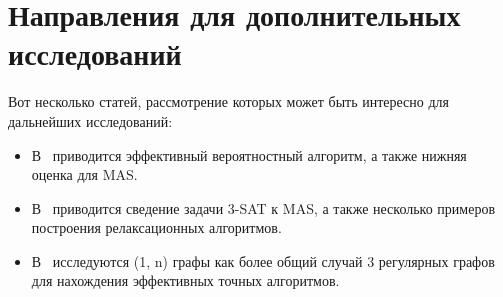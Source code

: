 

\section{Направления для дополнительных исследований}

Вот несколько статей, рассмотрение которых может быть интересно для 
дальнейших исследований:

\begin{itemize}
    \item В~\cite{rnd_low} приводится эффективный вероятностный алгоритм, а
        также нижняя оценка для MAS.

    \item В~\cite{approx_alg} приводится сведение задачи 3-SAT к MAS, а также
        несколько примеров построения релаксационных алгоритмов.

    \item В~\cite{exact_alg_1n} исследуются (1, n) графы как более общий случай
        3 регулярных графов для нахождения эффективных точных алгоритмов.
\end{itemize}
